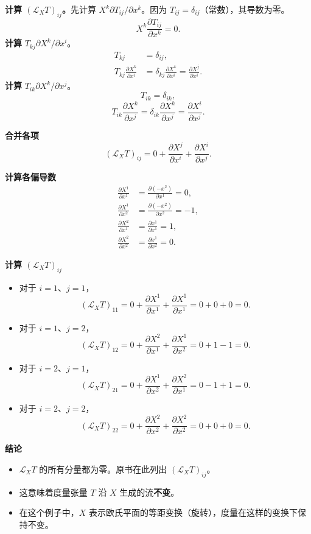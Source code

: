 \textbf{计算 $(\mathcal L_X T)_{ij}$。}先计算 $X^k\partial T_{ij}/\partial x^k$。因为 $T_{ij}=\delta_{ij}$（常数），其导数为零。
\[
  X^k\frac{\partial T_{ij}}{\partial x^k}=0.
\]
\textbf{计算} $T_{kj}\partial X^k/\partial x^i$。
\[
  \begin{aligned}
    T_{kj}&=\delta_{ij},\\
    T_{kj}\frac{\partial X^k}{\partial x^i}
       &=\delta_{kj}\frac{\partial X^k}{\partial x^i}
        =\frac{\partial X^j}{\partial x^i}.
  \end{aligned}
\]
\textbf{计算} $T_{ik}\partial X^k/\partial x^j$。
\[
  T_{ik}=\delta_{ik},
\]
\[
  T_{ik}\frac{\partial X^k}{\partial x^j}
    =\delta_{ik}\frac{\partial X^k}{\partial x^j}
    =\frac{\partial X^i}{\partial x^j}.
\]

\textbf{合并各项}
\[
  (\mathcal L_X T)_{ij}=0+\frac{\partial X^j}{\partial x^i}
                           +\frac{\partial X^i}{\partial x^j}.
\]

\textbf{计算各偏导数}
\[
  \begin{aligned}
    \frac{\partial X^1}{\partial x^1}&=\frac{\partial(-x^2)}{\partial x^1}=0,\\
    \frac{\partial X^1}{\partial x^2}&=\frac{\partial(-x^2)}{\partial x^2}=-1,\\
    \frac{\partial X^2}{\partial x^1}&=\frac{\partial x^1}{\partial x^1}=1,\\
    \frac{\partial X^2}{\partial x^2}&=\frac{\partial x^1}{\partial x^2}=0.
  \end{aligned}
\]

\textbf{计算 $(\mathcal L_X T)_{ij}$}
\begin{itemize}
  \item 对于 $i=1$、$j=1$，
  \[
    (\mathcal L_X T)_{11}=0+\frac{\partial X^1}{\partial x^1}
         +\frac{\partial X^1}{\partial x^1}=0+0+0=0.
  \]
  \item 对于 $i=1$、$j=2$，
  \[
    (\mathcal L_X T)_{12}=0+\frac{\partial X^2}{\partial x^1}
         +\frac{\partial X^1}{\partial x^2}=0+1-1=0.
  \]
  \item 对于 $i=2$、$j=1$，
  \[
    (\mathcal L_X T)_{21}=0+\frac{\partial X^1}{\partial x^2}
         +\frac{\partial X^2}{\partial x^1}=0-1+1=0.
  \]
  \item 对于 $i=2$、$j=2$，
  \[
    (\mathcal L_X T)_{22}=0+\frac{\partial X^2}{\partial x^2}
         +\frac{\partial X^2}{\partial x^2}=0+0+0=0.
  \]
\end{itemize}

\textbf{结论}
\begin{itemize}
  \item $\mathcal L_X T$ 的所有分量都为零。原书在此列出 $(\mathcal L_X T)_{ij}$。
  \item 这意味着度量张量 $T$ 沿 $X$ 生成的流\textbf{不变}。
  \item 在这个例子中，$X$ 表示欧氏平面的等距变换（旋转），度量在这样的变换下保持不变。
\end{itemize}
